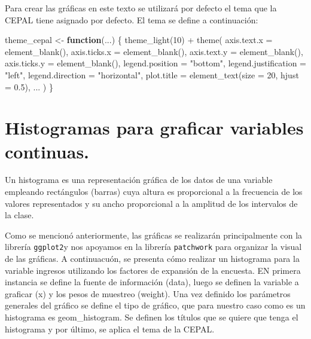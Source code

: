 \documentclass[
  12pt,
]{book}
\newenvironment{Shaded}{\begin{snugshade}}{\end{snugshade}}
\newcommand{\AttributeTok}[1]{\textcolor[rgb]{0.77,0.63,0.00}{#1}}
\newcommand{\ControlFlowTok}[1]{\textcolor[rgb]{0.13,0.29,0.53}{\textbf{#1}}}
\newcommand{\DecValTok}[1]{\textcolor[rgb]{0.00,0.00,0.81}{#1}}
\newcommand{\FloatTok}[1]{\textcolor[rgb]{0.00,0.00,0.81}{#1}}
\newcommand{\FunctionTok}[1]{\textcolor[rgb]{0.00,0.00,0.00}{#1}}
\newcommand{\NormalTok}[1]{#1}
\newcommand{\OtherTok}[1]{\textcolor[rgb]{0.56,0.35,0.01}{#1}}
\newcommand{\SpecialCharTok}[1]{\textcolor[rgb]{0.00,0.00,0.00}{#1}}
\newcommand{\StringTok}[1]{\textcolor[rgb]{0.31,0.60,0.02}{#1}}
\begin{document}
Para crear las gráficas en este texto se utilizará por defecto el tema que la CEPAL tiene asignado por defecto. El tema se define a continuación:

\begin{Shaded}
\begin{Highlighting}[]
\NormalTok{theme\_cepal }\OtherTok{\textless{}{-}} \ControlFlowTok{function}\NormalTok{(...) \{}
  \FunctionTok{theme\_light}\NormalTok{(}\DecValTok{10}\NormalTok{) }\SpecialCharTok{+}
    \FunctionTok{theme}\NormalTok{(}
      \AttributeTok{axis.text.x =} \FunctionTok{element\_blank}\NormalTok{(),}
      \AttributeTok{axis.ticks.x =} \FunctionTok{element\_blank}\NormalTok{(),}
      \AttributeTok{axis.text.y =} \FunctionTok{element\_blank}\NormalTok{(),}
      \AttributeTok{axis.ticks.y =} \FunctionTok{element\_blank}\NormalTok{(),}
      \AttributeTok{legend.position =} \StringTok{"bottom"}\NormalTok{,}
      \AttributeTok{legend.justification =} \StringTok{"left"}\NormalTok{,}
      \AttributeTok{legend.direction =} \StringTok{"horizontal"}\NormalTok{,}
      \AttributeTok{plot.title =} \FunctionTok{element\_text}\NormalTok{(}\AttributeTok{size =} \DecValTok{20}\NormalTok{, }\AttributeTok{hjust =} \FloatTok{0.5}\NormalTok{),}
\NormalTok{      ...}
\NormalTok{    )}
\NormalTok{\}}
\end{Highlighting}
\end{Shaded}

\hypertarget{histogramas-para-graficar-variables-continuas.}{%
\section{Histogramas para graficar variables continuas.}\label{histogramas-para-graficar-variables-continuas.}}

Un histograma es una representación gráfica de los datos de una variable empleando
rectángulos (barras) cuya altura es proporcional a la frecuencia de los valores representados y su ancho proporcional a la amplitud de los intervalos de la clase.

Como se mencionó anteriormente, las gráficas se realizarán principalmente con la librería \texttt{ggplot2}y nos apoyamos en la librería \texttt{patchwork} para organizar la visual de las gráficas. A continuacuón, se presenta cómo realizar un histograma para la variable ingresos utilizando los factores de expansión de la encuesta. EN primera instancia se define la fuente de información (data), luego se definen la variable a graficar (x) y los pesos de muestreo (weight). Una vez definido los parámetros generales del gráfico se define el tipo de gráfico, que para nuestro caso como es un histograma es geom\_histogram. Se definen los títulos que se quiere que tenga el histograma y por último, se aplica el tema de la CEPAL.
\end{document}
